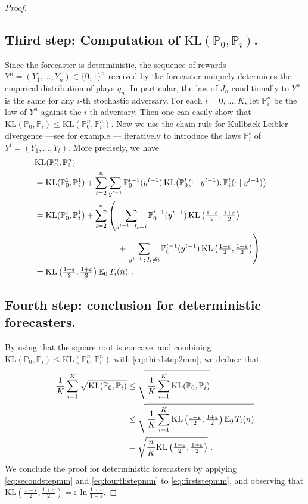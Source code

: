 \documentclass[11pt]{hackednow}
\newcommand{\K}{\mathrm{KL}}
\renewcommand{\P}{\mathbb{P}}
\newcommand{\E}{\mathbb{E}}
\renewcommand{\epsilon}{\varepsilon}
\begin{document}
\begin{proof}
\subsection*{Third step: Computation of $\K(\P_{0}, \P_{i})$.
}
%
Since the forecaster is deterministic, the sequence of rewards $Y^n = (Y_1,\hdots,Y_n) \in \{0,1\}^n$ received by the forecaster uniquely determines the empirical distribution of plays $q_n$. In particular, the law of $J_n$ conditionally to $Y^n$ is the same for any $i$-th stochastic adversary. For each $i=0, \hdots, K$, let $\P_i^n$ be the law of $Y^n$ against the $i$-th adversary. Then one can easily show that 
$
\K(\P_{0}, \P_{i}) \leq \K(\P_{0}^n, \P_{i}^n)
$.
Now we use the chain rule for Kullback-Leibler divergence ---see for example \cite[Section A.2]{CL06}--- iteratively to introduce the laws $\P^t_i$ of $Y^t=(Y_1, \hdots, Y_t)$. More precisely, we have
%
\begin{align}
\lefteqn{\K(\P_{0}^n, \P_{i}^n)} \notag \\
& = \K(\P_0^1, \P_i^1) + \sum_{t=2}^n \sum_{y^{t-1}} \P_0^{t-1}(y^{t-1})\,\K\bigl(\P_{0}^t(\cdot\mid y^{t-1}),\P_{i}^t(\cdot\mid y^{t-1})\bigr) \notag \\
& = \K(\P_0^1, \P_i^1) + \sum_{t=2}^n \left( \sum_{y^{t-1} \,:\, I_t = i} \P_0^{t-1}(y^{t-1})\,\K\left(\tfrac{1-\epsilon}{2},\tfrac{1+\epsilon}{2}\right) \right. \notag \\
&\qquad\qquad\qquad\qquad\qquad
+ \left. \sum_{y^{t-1} \,:\, I_t \neq i} \P_0^{t-1}(y^{t-1})\,\K\left(\tfrac{1+\epsilon}{2}, \tfrac{1+\epsilon}{2}\right)\right) \notag \\
& = \K\left(\tfrac{1-\epsilon}{2}, \tfrac{1+\epsilon}{2} \right) \E_0\,T_{i}(n)~. \label{eq:thirdstep2mm}
\end{align}
%
\subsection*{Fourth step: conclusion for deterministic forecasters.
}
%
By using that the square root is concave, and combining $\K(\P_{0}, \P_{i}) \leq \K(\P_{0}^n, \P_{i}^n)$ with \eqref{eq:thirdstep2mm}, we deduce that
\begin{align}
\frac{1}{K} \sum_{i=1}^K \sqrt{\K(\P_{0},\P_{i})}& \leq \sqrt{\frac{1}{K} \sum_{i=1}^K \K(\P_{0},\P_{i})} \notag \\
& \leq \sqrt{\frac{1}{K} \sum_{i=1}^K \K\left(\tfrac{1-\epsilon}{2}, \tfrac{1+\epsilon}{2} \right) \E_0\,T_{i}(n)} \notag \\
& = \sqrt{\frac{n}{K} \K\left(\tfrac{1-\epsilon}{2}, \tfrac{1+\epsilon}{2} \right)}~. \label{eq:fourthstepmm}
\end{align}
We conclude the proof for deterministic forecasters by applying \eqref{eq:secondstepmm} and \eqref{eq:fourthstepmm} to \eqref{eq:firststepmm}, and observing that
$
\K\left(\tfrac{1-\epsilon}{2}, \tfrac{1+\epsilon}{2} \right) = 
\epsilon \ln\tfrac{1+\epsilon}{1-\epsilon}
$.


\end{proof}
\end{document}
